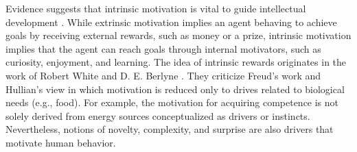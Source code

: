 Evidence suggests that intrinsic motivation is vital to guide intellectual development \cite{barto2013intrinsic}. While extrinsic motivation implies an agent behaving to achieve goals by receiving external rewards, such as money or a prize, intrinsic motivation implies that the agent can reach goals through internal motivators, such as curiosity, enjoyment, and learning. The idea of intrinsic rewards originates in the work of Robert White \cite{white1959motivation} and D. E. Berlyne \cite{berlyne1966curiosity}. They criticize Freud’s work and Hullian’s view in which motivation is reduced only to drives related to biological needs (e.g., food). For example, the motivation for acquiring competence is not solely derived from energy sources conceptualized as drivers or instincts. Nevertheless, notions of novelty, complexity, and surprise are also drivers that motivate human behavior.




